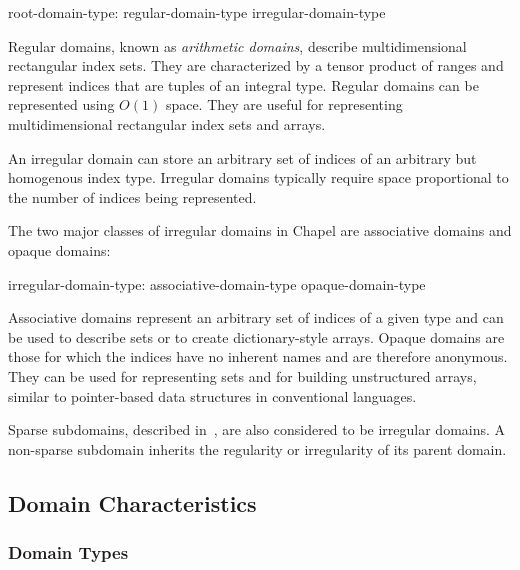 \begin{syntax}
root-domain-type:
  regular-domain-type
  irregular-domain-type
\end{syntax}

Regular domains, known as \emph{arithmetic domains}, describe
multidimensional rectangular index sets.  They are characterized by a
tensor product of ranges and represent indices that are tuples of an
integral type.  Regular domains can be represented using $O(1)$ space.
They are useful for representing multidimensional rectangular index
sets and arrays.


An irregular domain can store an arbitrary set of indices of an
arbitrary but homogenous index type.  Irregular domains typically
require space proportional to the number of indices being
represented.


The two major classes of irregular domains in Chapel are associative
domains and opaque domains:

\begin{syntax}
irregular-domain-type:
  associative-domain-type
  opaque-domain-type
\end{syntax}

\noindent Associative domains represent an arbitrary set of indices
of a given type and can be used to describe sets or to create
dictionary-style arrays.  Opaque domains are those for which the
indices have no inherent names and are therefore anonymous.  They can
be used for representing sets and for building unstructured arrays,
similar to pointer-based data structures in conventional languages.

Sparse subdomains, described in~, are also
considered to be irregular domains.  A non-sparse subdomain inherits
the regularity or irregularity of its parent domain.


\subsection{Domain Characteristics}
\label{Domain_Characteristics}

\subsubsection{Domain Types}
\label{Domain_Types}

